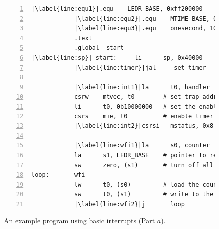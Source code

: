 \documentclass[11pt, twoside, pdftex]{article}
\begin{document}
\begin{figure}[h]
\begin{center} \begin{minipage}[h]{15 cm}
\begin{lstlisting}[style=defaultNiosVStyle, name=ints, numbers=left, escapechar=|]
            |\label{line:equ1}|.equ    LEDR_BASE, 0xff200000
            |\label{line:equ2}|.equ    MTIME_BASE, 0xff202100
            |\label{line:equ3}|.equ    onesecond, 100000000
            .text
            .global _start
|\label{line:sp}|_start:     li      sp, 0x40000      # initialize the stack location
            |\label{line:timer}|jal     set_timer        # initialize the timer
     
            |\label{line:int1}|la      t0, handler
            csrw    mtvec, t0        # set trap address
            li      t0, 0b10000000   # set the enable pattern
            csrs    mie, t0          # enable timer interrupts
            |\label{line:int2}|csrsi   mstatus, 0x8     # enable global interrupts

            |\label{line:wfi1}|la      s0, counter      # pointer to counter
            la      s1, LEDR_BASE    # pointer to red lights
            sw      zero, (s1)       # turn off all lights
loop:       wfi
            lw      t0, (s0)         # load the counter value
            sw      t0, (s1)         # write to the lights
            |\label{line:wfi2}|j       loop
\end{lstlisting}
	\caption{An example program using basic interrupts (Part $a$).}
	\label{fig:ints}
\end{minipage}
\end{center}
\end{figure}
\end{document}
